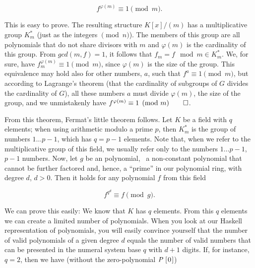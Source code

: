 \documentclass[tikz]{scrreprt}
\newcommand{\Conid}[1]{\mathit{#1}}
\begin{document}
\begin{equation}
f^{\varphi(m)} \equiv 1 \pmod{m}.
\end{equation}

This is easy to prove.
The resulting structure $K[x]/(m)$
has a multiplicative
group $K_m^*$ (just as the integers $\pmod{n}$).
The members of this group are all polynomials
that do not share divisors with $m$ and $\varphi(m)$
is the cardinality of this group.
From $gcd(m,f) = 1$, it follows that
$f_m = f \mod{m} \in K_m^*$.
We, for sure, have 
$f_m^{\varphi(m)} \equiv 1 \pmod{m}$, since 
$\varphi(m)$ is the size of the group.
This equivalence may hold also for other numbers, $a$,
such that $f^a \equiv 1 \pmod{m}$, but
according to Lagrange's theorem 
(that the cardinality of subgroups of $G$ divides
the cardinality of $G$), all these numbers $a$
must divide $\varphi(m)$, the size of the group,
and we unmistakenly have
$f^{\varphi(m)} \equiv 1 \pmod{m}\qed$.

From this theorem, Fermat's little theorem
follows. Let $K$ be a field with $q$ elements; when using
arithmetic modulo a prime $p$, then $K_m^*$ is the group
of numbers $1\dots p-1$, which has $q=p-1$ elements.
Note that, when we refer to the multiplicative group
of this field, we usually refer only to the numbers
$1\dots p-1$, \ie\ $p-1$ numbers.
Now, let $g$ be an  polynomial,
\ie\ a non-constant polynomial that cannot be 
further factored and, hence, a ``prime'' in our polynomial ring,
with degree $d$, $d>0$. Then it holds for any polynomial $f$
from this field

\begin{equation}\label{eq:polyFacFermat}
f^{q^d} \equiv f \pmod{g}.
\end{equation}

We can prove this easily:
We know that $K$ has $q$ elements.
From this $q$ elements we can create 
a limited number of polynomials.
When you look at our Haskell representation of polynomials,
you will easily convince yourself that the number of valid
polynomials of a given degree $d$ equals the number of valid
numbers that can be presented in the numeral system base $q$
with $d+1$ digits. If, for instance, $q=2$, then we have
(without the zero-polynomial \ensuremath{\Conid{P}\;[\mskip1.5mu \mathrm{0}\mskip1.5mu]})
\end{document}
